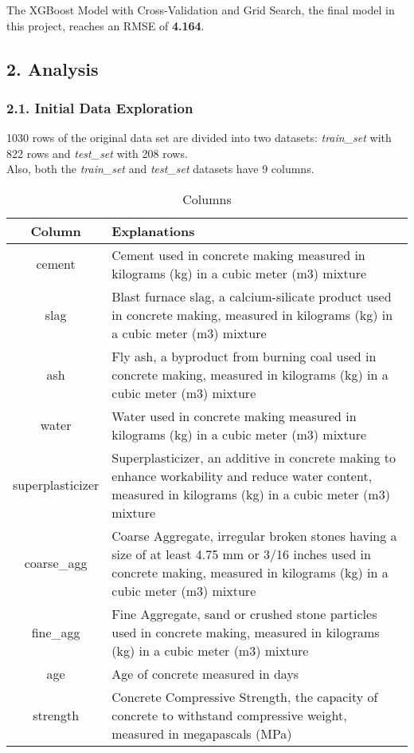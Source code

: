 \documentclass[
]{article}
\begin{document}
The XGBoost Model with Cross-Validation and Grid Search, the final model
in this project, reaches an RMSE of \textbf{4.164}.

\hypertarget{analysis}{%
\subsection{2. Analysis}\label{analysis}}

\hypertarget{initial-data-exploration}{%
\subsubsection{2.1. Initial Data
Exploration}\label{initial-data-exploration}}

1030 rows of the original data set are divided into two datasets:
\emph{train\_set} with 822 rows and \emph{test\_set} with 208 rows.\\
Also, both the \emph{train\_set} and \emph{test\_set} datasets have 9
columns.

\begin{table}[H]

\caption{\label{tab:Table 1: Columns names with explanation}Columns}
\centering
\fontsize{9}{11}\selectfont
\begin{tabular}[t]{|>{}c||>{\raggedright\arraybackslash}p{40em}|}
\hline
Column & Explanations\\
\hline
cement & Cement used in concrete making measured in kilograms (kg) in a cubic meter (m3) mixture\\
\hline
slag & Blast furnace slag, a calcium-silicate product used in concrete making, measured in kilograms (kg) in a cubic meter (m3) mixture\\
\hline
ash & Fly ash, a byproduct from burning coal used in concrete making, measured in kilograms (kg) in a cubic meter (m3) mixture\\
\hline
water & Water used in concrete making measured in kilograms (kg) in a cubic meter (m3) mixture\\
\hline
superplasticizer & Superplasticizer, an additive in concrete making to enhance workability and reduce water content, measured in kilograms (kg) in a cubic meter (m3) mixture\\
\hline
coarse\_agg & Coarse Aggregate, irregular broken stones having a size of at least 4.75 mm or 3/16 inches used in concrete making, measured in kilograms (kg) in a cubic meter (m3) mixture\\
\hline
fine\_agg & Fine Aggregate, sand or crushed stone particles used in concrete making, measured in kilograms (kg) in a cubic meter (m3) mixture\\
\hline
age & Age of concrete measured in days\\
\hline
strength & Concrete Compressive Strength, the capacity of concrete to withstand compressive weight, measured in megapascals (MPa)\\
\hline
\end{tabular}
\end{table}
\end{document}
